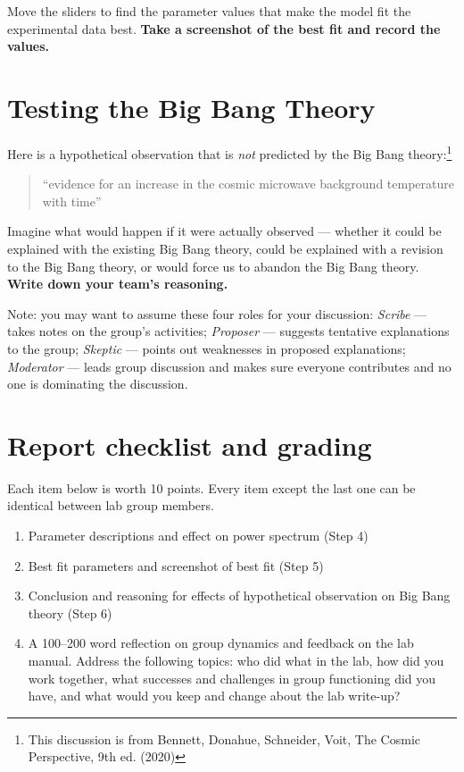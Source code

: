 \begin{steps}
	\item Move the sliders to find the parameter values that make the model fit the experimental data best. \textbf{Take a screenshot of the best fit and record the values.}
\end{steps}

\section{Testing the Big Bang Theory}

Here is a hypothetical observation that is \textit{not} predicted by the Big Bang theory:\footnote{This discussion is from Bennett, Donahue, Schneider, Voit, The Cosmic Perspective, 9th ed. (2020)}

\begin{quote}
	``evidence for an increase in the cosmic microwave background temperature with time''
\end{quote}

\begin{steps}
	\item Imagine what would happen if it were actually observed --- whether it could be explained with the existing Big Bang theory, could be explained with a revision to the Big Bang theory, or would force us to abandon the Big Bang theory. \textbf{Write down your team's reasoning.}

    Note: you may want to assume these four roles for your discussion: \textit{Scribe} --- takes notes on the group's activities; \textit{Proposer} --- suggests tentative explanations to the group; \textit{Skeptic} --- points out weaknesses in proposed explanations; \textit{Moderator} --- leads group discussion and makes sure everyone contributes and no one is dominating the discussion.
\end{steps}

\section{Report checklist and grading}

Each item below is worth 10 points. Every item except the last one can be identical between lab group members.

\begin{enumerate}
	\item Parameter descriptions and effect on power spectrum (Step 4)
	
	\item Best fit parameters and screenshot of best fit (Step 5)
	
	\item Conclusion and reasoning for effects of hypothetical observation on Big Bang theory (Step 6)
	
	\item A 100--200 word reflection on group dynamics and feedback on the lab manual. Address the following topics: who did what in the lab, how did you work together, what successes and challenges in group functioning did you have, and what would you keep and change about the lab write-up?
\end{enumerate}